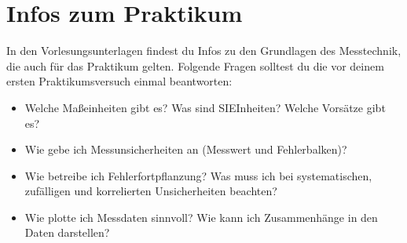 \documentclass[letterpaper,10pt,english]{jupyterBook}
\begin{document}
\sphinxstepscope


\chapter{Infos zum Praktikum}
\label{\detokenize{content/0_Praktikum:infos-zum-praktikum}}\label{\detokenize{content/0_Praktikum::doc}}
\sphinxAtStartPar
In den Vorlesungsunterlagen findest du Infos zu den Grundlagen des Messtechnik, die auch für das Praktikum gelten. Folgende Fragen solltest du die vor deinem ersten Praktikumsversuch einmal beantworten:
\begin{itemize}
\item {} 
\sphinxAtStartPar
{\hyperref[\detokenize{content/1_Messen_Einheit::doc}]{}} Welche Maßeinheiten gibt es? Was sind SI\sphinxhyphen{}EInheiten? Welche Vorsätze gibt es?

\item {} 
\sphinxAtStartPar
{\hyperref[\detokenize{content/1_Messunsicherheiten::doc}]{}} {\hyperref[\detokenize{content/1_Messunsicherheiten::doc}]{}} {\hyperref[\detokenize{content/1_Mittelwert_StdAbw::doc}]{}} Wie gebe ich Messunsicherheiten an (Messwert und Fehlerbalken)?

\item {} 
\sphinxAtStartPar
{\hyperref[\detokenize{content/1_Fehlerfortpflanzung::doc}]{}} Wie betreibe ich Fehlerfortpflanzung? Was muss ich bei systematischen, zufälligen und korrelierten Unsicherheiten beachten?

\item {} 
\sphinxAtStartPar
{\hyperref[\detokenize{content/1_Kurvenanpassung::doc}]{}} Wie plotte ich Messdaten sinnvoll? Wie kann ich Zusammenhänge in den Daten darstellen?

\end{itemize}
\end{document}
